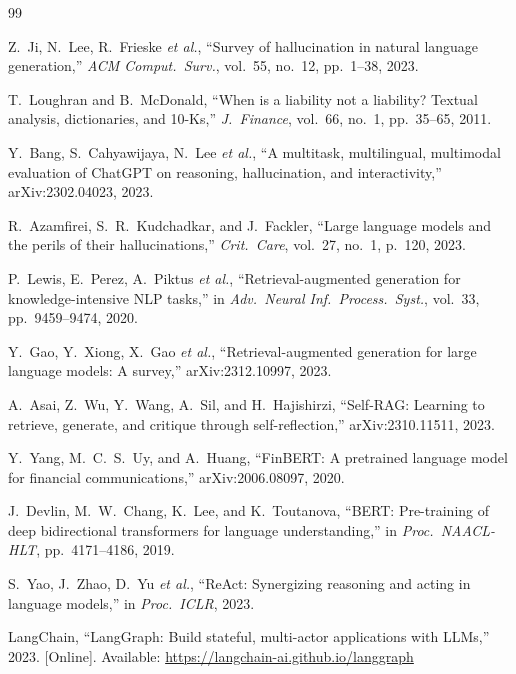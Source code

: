 \documentclass[10pt,twocolumn]{article}
\begin{document}
\begin{thebibliography}{99}

Z.~Ji, N.~Lee, R.~Frieske \emph{et al.},
``Survey of hallucination in natural language generation,''
\emph{ACM Comput.\ Surv.}, vol.~55, no.~12, pp.~1--38, 2023.

T.~Loughran and B.~McDonald,
``When is a liability not a liability? Textual analysis, dictionaries,
and 10-Ks,''
\emph{J.~Finance}, vol.~66, no.~1, pp.~35--65, 2011.

Y.~Bang, S.~Cahyawijaya, N.~Lee \emph{et al.},
``A multitask, multilingual, multimodal evaluation of ChatGPT on
reasoning, hallucination, and interactivity,''
arXiv:2302.04023, 2023.

R.~Azamfirei, S.~R.~Kudchadkar, and J.~Fackler,
``Large language models and the perils of their hallucinations,''
\emph{Crit.\ Care}, vol.~27, no.~1, p.~120, 2023.

P.~Lewis, E.~Perez, A.~Piktus \emph{et al.},
``Retrieval-augmented generation for knowledge-intensive NLP tasks,''
in \emph{Adv.\ Neural Inf.\ Process.\ Syst.}, vol.~33,
pp.~9459--9474, 2020.

Y.~Gao, Y.~Xiong, X.~Gao \emph{et al.},
``Retrieval-augmented generation for large language models: A survey,''
arXiv:2312.10997, 2023.

A.~Asai, Z.~Wu, Y.~Wang, A.~Sil, and H.~Hajishirzi,
``Self-RAG: Learning to retrieve, generate, and critique through
self-reflection,''
arXiv:2310.11511, 2023.

Y.~Yang, M.~C.~S.~Uy, and A.~Huang,
``FinBERT: A pretrained language model for financial communications,''
arXiv:2006.08097, 2020.

J.~Devlin, M.~W.~Chang, K.~Lee, and K.~Toutanova,
``BERT: Pre-training of deep bidirectional transformers for language
understanding,''
in \emph{Proc.\ NAACL-HLT}, pp.~4171--4186, 2019.

S.~Yao, J.~Zhao, D.~Yu \emph{et al.},
``ReAct: Synergizing reasoning and acting in language models,''
in \emph{Proc.\ ICLR}, 2023.

LangChain,
``LangGraph: Build stateful, multi-actor applications with LLMs,''
2023. [Online]. Available: \url{https://langchain-ai.github.io/langgraph}


\end{thebibliography}
\end{document}
